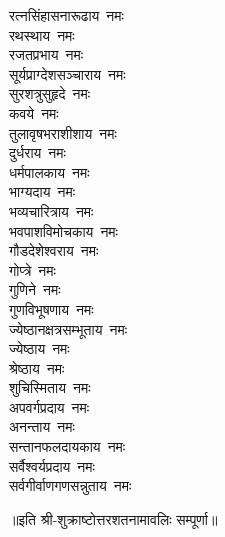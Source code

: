 \begin{flushleft}
\begin{multicols}{2}
रत्नसिंहासनारूढाय~नमः\\
रथस्थाय~नमः\\
रजतप्रभाय~नमः\\
सूर्यप्राग्देशसञ्चाराय~नमः\\
सुरशत्रुसुहृदे~नमः\\
कवये~नमः\\
तुलावृषभराशीशाय~नमः\hfill{}\\
दुर्धराय~नमः\\
धर्मपालकाय~नमः\\
भाग्यदाय~नमः\\
भव्यचारित्राय~नमः\\
भवपाशविमोचकाय~नमः\\
गौडदेशेश्वराय~नमः\\
गोप्त्रे~नमः\\
गुणिने~नमः\\
गुणविभूषणाय~नमः\\
ज्येष्ठानक्षत्रसम्भूताय~नमः\hfill{}\\
ज्येष्ठाय~नमः\\
श्रेष्ठाय~नमः\\
शुचिस्मिताय~नमः\\
अपवर्गप्रदाय~नमः\\
अनन्ताय~नमः\\
सन्तानफलदायकाय~नमः\\
सर्वैश्वर्यप्रदाय~नमः\\
सर्वगीर्वाणगणसन्नुताय~नमः\\
\end{multicols}
\end{flushleft}
॥इति श्री-शुक्राष्टोत्तरशतनामावलिः सम्पूर्णा॥
